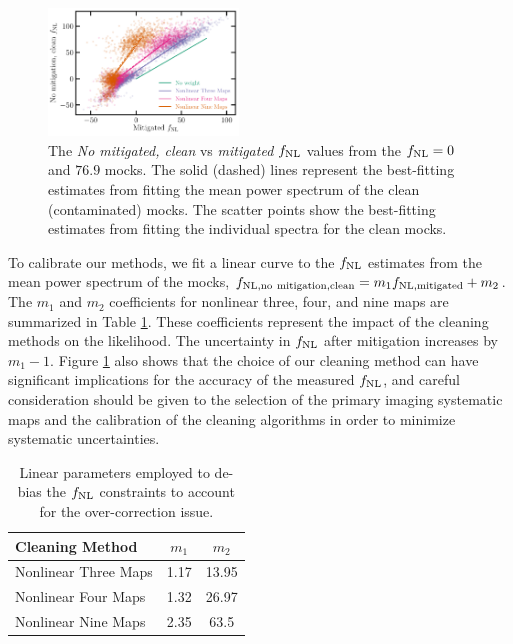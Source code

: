 \begin{figure}
\centering
\includegraphics[width=0.45\textwidth]{figures/fnlbias}
\caption{The \textit{No mitigated, clean} vs \textit{mitigated} $f_{\rm NL}$ values from the $f_{\rm NL}=0$ and $76.9$ mocks. The solid (dashed) lines represent the best-fitting estimates from fitting the mean power spectrum of the clean (contaminated) mocks. The scatter points show the best-fitting estimates from fitting the individual spectra for the clean mocks.}\label{fig:fnlbias}
\end{figure}

To calibrate our methods, we fit a linear curve to the $f_{\rm NL}$ estimates from the mean power spectrum of the mocks, $f_{\rm NL, no~mitigation, clean} = m_{1} f_{\rm NL, mitigated} + m_{2}$. The $m_{1}$ and $m_{2}$ coefficients for nonlinear three, four, and nine maps are summarized in Table \ref{tab:debiasparams}. These coefficients represent the impact of the cleaning methods on the likelihood. The uncertainty in $f_{\rm NL}$ after mitigation increases by $m_{1}-1$. Figure \ref{fig:fnlbias} also shows that the choice of our cleaning method can have significant implications for the accuracy of the measured $f_{\rm NL}$, and careful consideration should be given to the selection of the primary imaging systematic maps and the calibration of the cleaning algorithms in order to minimize systematic uncertainties.


\begin{table}
\begin{center}
\caption{Linear parameters employed to de-bias the $f_{\rm NL}$ constraints to account for the over-correction issue.}\label{tab:debiasparams}
\begin{tabular}{lcc}
\hline
\hline
\textbf{Cleaning Method} & $m_{1}$ & $m_{2}$ \\
\hline
Nonlinear Three Maps & 1.17 & 13.95 \\
Nonlinear Four Maps & 1.32 & 26.97 \\
Nonlinear Nine Maps & 2.35 & 63.5\\
\hline
\end{tabular}
\end{center}
\end{table}
